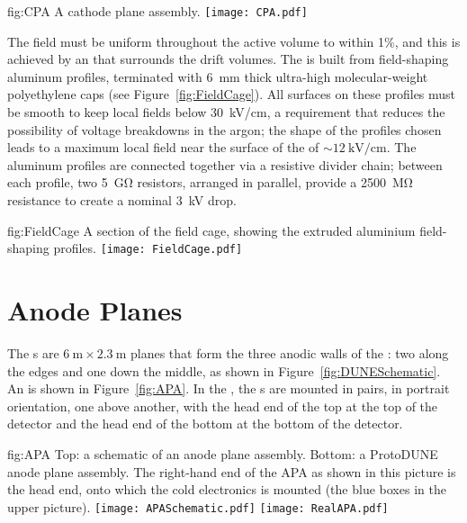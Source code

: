 \begin{dunefigure}{fig:CPA}
{A cathode plane assembly.}
\texttt{[image: CPA.pdf]}
\end{dunefigure}

The field must be uniform throughout the active  volume to within 1\%, and this is achieved by an  that surrounds the drift volumes. The  is built from field-shaping aluminum profiles, terminated with \SI{6}{\mm} thick ultra-high molecular-weight polyethylene caps (see Figure~\ref{fig:FieldCage}). All surfaces on these profiles must be smooth to keep local fields below \SI{30}{\kilo\volt/\cm}, a requirement that reduces the possibility of voltage breakdowns in the argon; the shape of the profiles chosen leads to a maximum local field near the surface of the  of $\sim\!\SI{12}{\kilo\volt/\cm}$. The aluminum profiles are connected together via a resistive divider chain; between each profile, two \SI{5}{\giga\ohm} resistors, arranged in parallel, provide a \SI{2500}{\mega\ohm} resistance to create a nominal \SI{3}{\kilo\volt} drop.

\begin{dunefigure}{fig:FieldCage}
{A section of the field cage, showing the extruded aluminium field-shaping profiles.}
\texttt{[image: FieldCage.pdf]}
\end{dunefigure}

\section{Anode Planes}
\label{sec:fdsp-exec-apas}

The s are $\SI{6}{\meter}\times\SI{2.3}{\meter}$ planes that form the three anodic walls of the : two along the edges and one down the middle, as shown in Figure~\ref{fig:DUNESchematic}. An  is shown in Figure~\ref{fig:APA}. In the , the s are mounted in pairs, in portrait orientation, one above another, with the head end of the top  at the top of the detector and the head end of the bottom  at the bottom of the detector.

\begin{dunefigure}{fig:APA}
{Top: a schematic of an anode plane assembly. Bottom: a ProtoDUNE anode plane assembly. The right-hand end of the APA as shown in this picture is the head end, onto which the cold electronics is mounted (the blue boxes in the upper picture). }
\texttt{[image: APASchematic.pdf]}
\texttt{[image: RealAPA.pdf]}
\end{dunefigure}

